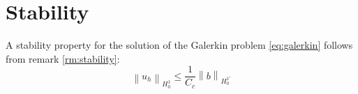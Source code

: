 \documentclass[../Main/main.tex]{subfiles}
\begin{document}
	\section*{Stability}
	A stability property for the solution of the Galerkin problem \eqref{eq:galerkin} follows from remark \eqref{rm:stability}:
	\begin{equation*}
		\left \| u_h \right \|_{H_0^1} \leq \frac{1}{C_c}\left \| b \right \|_{H_0^{1'}}
	\end{equation*}
	
	
\end{document}
